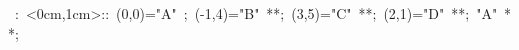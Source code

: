 
\hbox{
\xy    <1cm,0cm>: <0cm,1cm>::
       (0,0)="A" ; (-1,4)="B" **\dir{-}; 
       (3,5)="C" **\dir{-};
       (2,1)="D"  **\dir{-};
       "A"  **\dir{-};
       \endxy}
	   
